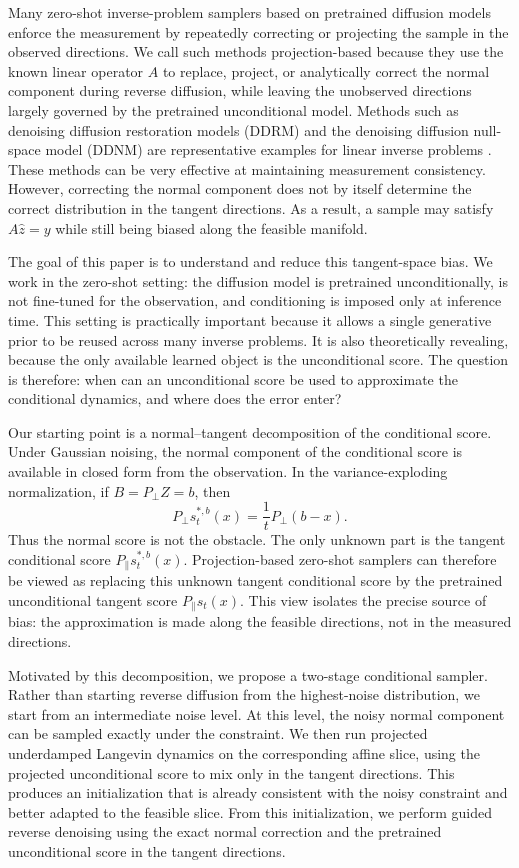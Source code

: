 \documentclass[twoside,11pt]{article}
\numberwithin{equation}{section}
\begin{document}
Many zero-shot inverse-problem samplers based on pretrained diffusion models
enforce the measurement by repeatedly correcting or projecting the sample in the
observed directions. We call such methods projection-based because they use the
known linear operator \(A\) to replace, project, or analytically correct the
normal component during reverse diffusion, while leaving the unobserved
directions largely governed by the pretrained unconditional model. Methods such as denoising diffusion restoration models (DDRM) and the denoising
diffusion null-space model (DDNM) are representative examples for linear inverse
problems \citep{kawar2022ddrm, wang2022ddnm}. These methods can be very effective at
maintaining measurement consistency. However, correcting the normal component
does not by itself determine the correct distribution in the tangent directions.
As a result, a sample may satisfy \(A\hat z=y\) while still being biased along
the feasible manifold.

The goal of this paper is to understand and reduce this tangent-space bias. We
work in the zero-shot setting: the diffusion model is pretrained
unconditionally, is not fine-tuned for the observation, and conditioning is
imposed only at inference time. This setting is practically important because it
allows a single generative prior to be reused across many inverse problems. It
is also theoretically revealing, because the only available learned object is
the unconditional score. The question is therefore: when can an unconditional
score be used to approximate the conditional dynamics, and where does the error
enter?

Our starting point is a normal--tangent decomposition of the conditional score.
Under Gaussian noising, the normal component of the conditional score is
available in closed form from the observation. In the variance-exploding
normalization, if \(B=P_\perp Z=b\), then
\[
    P_\perp s_t^{*,b}(x)=\frac{1}{t}P_\perp(b-x).
\]
Thus the normal score is not the obstacle. The only unknown part is the tangent
conditional score \(P_\parallel s_t^{*,b}(x)\). Projection-based zero-shot
samplers can therefore be viewed as replacing this unknown tangent conditional
score by the pretrained unconditional tangent score \(P_\parallel s_t(x)\). This
view isolates the precise source of bias: the approximation is made along the
feasible directions, not in the measured directions.

Motivated by this decomposition, we propose a two-stage conditional sampler.
Rather than starting reverse diffusion from the highest-noise distribution, we
start from an intermediate noise level. At this level, the noisy normal
component can be sampled exactly under the constraint. We then run projected
underdamped Langevin dynamics on the corresponding affine slice, using the
projected unconditional score to mix only in the tangent directions. This
produces an initialization that is already consistent with the noisy constraint
and better adapted to the feasible slice. From this initialization, we perform
guided reverse denoising using the exact normal correction and the pretrained
unconditional score in the tangent directions.
\end{document}
